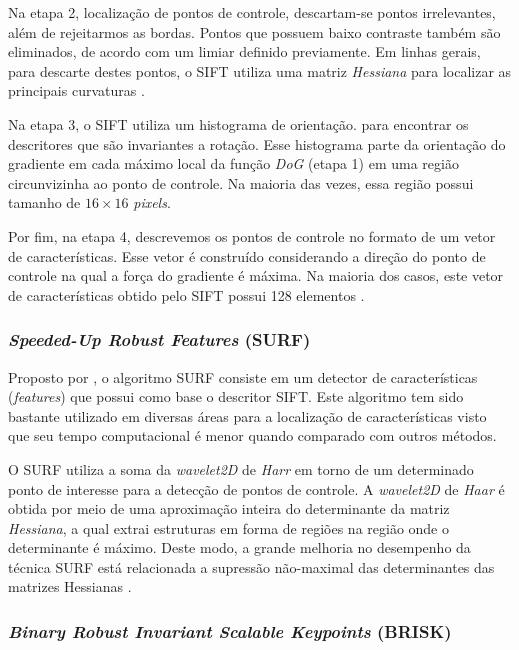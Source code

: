 \documentclass[12pt]{article}
\begin{document}
Na etapa 2, localização de pontos de controle, descartam-se pontos irrelevantes, além de rejeitarmos as bordas. Pontos que possuem baixo contraste também são eliminados, de acordo com um limiar definido previamente. Em linhas gerais, para descarte destes pontos, o SIFT utiliza uma matriz \textit{Hessiana} para localizar as principais curvaturas \cite{lowe}.

Na etapa 3, o SIFT utiliza um histograma de orientação. para encontrar os descritores que são invariantes a rotação. Esse histograma parte da orientação do gradiente em cada máximo local da função \textit{DoG} (etapa 1) em uma região circunvizinha ao ponto de controle. Na maioria das vezes, essa região possui tamanho de $16 \times 16$ \textit{pixels}.

Por fim, na etapa 4, descrevemos os pontos de controle no formato de um vetor de características. Esse vetor é construído considerando a direção do ponto de controle na qual a força do gradiente é máxima. Na maioria dos casos, este vetor de características obtido pelo SIFT possui 128 elementos \cite{lowe}.

\subsubsection{\textit{Speeded-Up Robust Features} (SURF)}

Proposto por \cite{SURF}, o algoritmo SURF consiste em um detector de características (\textit{features}) que possui como base o descritor SIFT. Este algoritmo tem sido bastante utilizado em diversas áreas para a localização de características visto que seu tempo computacional é menor quando comparado com outros métodos.

O SURF utiliza a soma da \textit{wavelet2D} de \textit{Harr} em torno de um determinado ponto de interesse para a detecção de pontos de controle. A \textit{wavelet2D} de \textit{Haar} é obtida por meio de uma aproximação inteira do determinante da matriz \textit{Hessiana}, a qual extrai estruturas em forma de regiões na região onde o determinante é máximo. Deste modo, a grande melhoria no desempenho da técnica SURF está relacionada a supressão não-maximal das determinantes das matrizes Hessianas \cite{HONG20081708}.

\subsubsection{\textit{Binary Robust Invariant Scalable Keypoints} (BRISK)}
\end{document}
